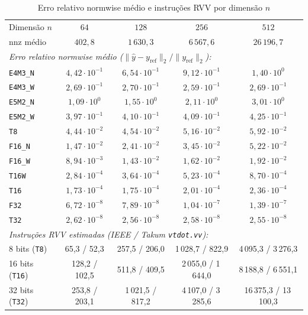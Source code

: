 \documentclass[journal]{IEEEtran}
\begin{document}
\begin{table}[!t]
\renewcommand{\arraystretch}{1.08}
\setlength{\tabcolsep}{2.2pt}
\caption{Erro relativo normwise médio e instruções RVV por dimensão $n$}
\label{tab:spmv_by_size}
\centering
\scriptsize
\begin{tabular}{l c c c c}
\hline
Dimensão $n$ & $64$ & $128$ & $256$ & $512$ \\
$\mathrm{nnz}$ médio & $402{,}8$ & $1\,630{,}3$ & $6\,567{,}6$ & $26\,196{,}7$ \\
\hline
\multicolumn{5}{l}{\emph{Erro relativo normwise médio ($\|\hat{y}-y_{\mathrm{ref}}\|_2 / \|y_{\mathrm{ref}}\|_2$):}} \\
\texttt{E4M3\_N} & $4{,}42\cdot 10^{-1}$ & $6{,}54\cdot 10^{-1}$ & $9{,}12\cdot 10^{-1}$ & $1{,}40\cdot 10^{0}$ \\
\texttt{E4M3\_W} & $2{,}69\cdot 10^{-1}$ & $2{,}70\cdot 10^{-1}$ & $2{,}59\cdot 10^{-1}$ & $2{,}69\cdot 10^{-1}$ \\
\texttt{E5M2\_N} & $1{,}09\cdot 10^{0}$  & $1{,}55\cdot 10^{0}$  & $2{,}11\cdot 10^{0}$  & $3{,}01\cdot 10^{0}$ \\
\texttt{E5M2\_W} & $3{,}97\cdot 10^{-1}$ & $4{,}10\cdot 10^{-1}$ & $4{,}09\cdot 10^{-1}$ & $4{,}25\cdot 10^{-1}$ \\
\texttt{T8}      & $4{,}44\cdot 10^{-2}$ & $4{,}54\cdot 10^{-2}$ & $5{,}16\cdot 10^{-2}$ & $5{,}92\cdot 10^{-2}$ \\
\texttt{F16\_N}  & $1{,}47\cdot 10^{-2}$ & $2{,}41\cdot 10^{-2}$ & $3{,}45\cdot 10^{-2}$ & $5{,}22\cdot 10^{-2}$ \\
\texttt{F16\_W}  & $8{,}94\cdot 10^{-3}$ & $1{,}43\cdot 10^{-2}$ & $1{,}62\cdot 10^{-2}$ & $1{,}92\cdot 10^{-2}$ \\
\texttt{T16W}    & $2{,}84\cdot 10^{-4}$ & $3{,}64\cdot 10^{-4}$ & $5{,}23\cdot 10^{-4}$ & $8{,}70\cdot 10^{-4}$ \\
\texttt{T16}     & $1{,}73\cdot 10^{-4}$ & $1{,}75\cdot 10^{-4}$ & $2{,}01\cdot 10^{-4}$ & $2{,}36\cdot 10^{-4}$ \\
\texttt{F32}     & $6{,}72\cdot 10^{-8}$ & $7{,}89\cdot 10^{-8}$ & $1{,}04\cdot 10^{-7}$ & $1{,}39\cdot 10^{-7}$ \\
\texttt{T32}     & $2{,}62\cdot 10^{-8}$ & $2{,}56\cdot 10^{-8}$ & $2{,}58\cdot 10^{-8}$ & $2{,}55\cdot 10^{-8}$ \\
\hline
\multicolumn{5}{l}{\emph{Instruções RVV estimadas (IEEE / Takum \texttt{vtdot.vv}):}} \\
8 bits (\texttt{T8})   & 65,3 / 52,3   & 257,5 / 206,0   & 1\,028,7 / 822,9   & 4\,095,3 / 3\,276,3 \\
16 bits (\texttt{T16}) & 128,2 / 102,5 & 511,8 / 409,5   & 2\,055,0 / 1\,644,0 & 8\,188,8 / 6\,551,1 \\
32 bits (\texttt{T32}) & 253,8 / 203,1 & 1\,021,5 / 817,2 & 4\,107,0 / 3\,285,6 & 16\,375,3 / 13\,100,3 \\
\hline
\end{tabular}
\end{table}
\end{document}
